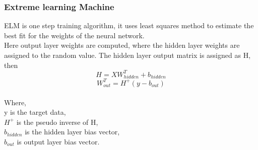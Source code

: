 \documentclass[conference]{IEEEtran}
\begin{document}
\subsubsection{Extreme learning Machine}
ELM is one step training algorithm, it uses least squares method to estimate the best fit for the weights of the neural network. \\
Here output layer weights are computed, where the hidden layer weights are assigned to the random value. The hidden layer output matrix is assigned as H, then 
\begin{equation} \label{eq:3}
H=XW_{hidden}^T+b_{hidden}
\end{equation}
\begin{equation} \label{eq:4}
W_{out}^T=H^+(y-b_{out})
\end{equation}
\\Where,\\
y is the target data,\\
$H^+$ is the pseudo inverse of H,\\
$b_{hidden}$ is the hidden layer bias vector,\\
$b_{out}$ is output layer bias vector.\\
\end{document}
